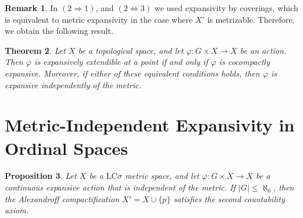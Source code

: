 \documentclass[12pt]{amsart}
\theoremstyle{plain}
\newtheorem{theorem}{Theorem}[section]
\newtheorem{proposition}[theorem]{Proposition}
\theoremstyle{definition}
\newtheorem{remark}[theorem]{Remark}
\theoremstyle{remark}
\begin{document}





\begin{remark}
In \( (2 \Rightarrow 1) \), and \( (2  \Leftrightarrow 3) \) we used expansivity by coverings, which is equivalent to metric expansivity in the case where \(X'\) is metrizable. Therefore, we obtain the following result.
\end{remark}

\begin{theorem}
Let \(X\) be a topological space, and let \(\varphi : G \times X \rightarrow X\) be an action. Then \(\varphi\) is expansively extendible at a point if and only if \(\varphi\) is cocompactly expansive. Moreover, if either of these equivalent conditions holds, then \(\varphi\) is expansive independently of the metric.
\end{theorem}











\section{Metric-Independent Expansivity in Ordinal Spaces}




\begin{proposition}
Let \(X\) be a $\text{LC}\sigma$ metric space, and let \(\varphi : G \times X \rightarrow X\) be a continuous expansive action that is independent of the metric. If \(|G| \leq \aleph_0\), then the Alexandroff compactification \(X' = X \cup \{ p \}\) satisfies the second countability axiom.
\end{proposition}
\end{document}
